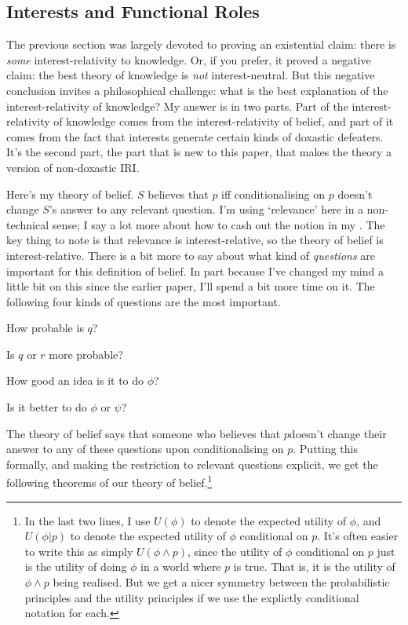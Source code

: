 \subsection{Interests and Functional Roles}
The previous section was largely devoted to proving an existential claim: there is \textit{some} interest-relativity to knowledge. Or, if you prefer, it proved a negative claim: the best theory of knowledge is \textit{not} interest-neutral. But this negative conclusion invites a philosophical challenge: what is the best explanation of the interest-relativity of knowledge? My answer is in two parts. Part of the interest-relativity of knowledge comes from the interest-relativity of belief, and part of it comes from the fact that interests generate certain kinds of doxastic defeaters. It's the second part, the part that is new to this paper, that makes the theory a version of non-doxastic IRI.

Here's my theory of belief. $S$ believes that $p$ iff conditionalising on $p$ doesn't change $S$'s answer to any relevant question. I'm using `relevance' here in a non-technical sense; I say a lot more about how to cash out the notion in my \citeyearpar{Weatherson2005-WEACWD}. The key thing to note is that relevance is interest-relative, so the theory of belief is interest-relative. There is a bit more to say about what kind of \textit{questions} are important for this definition of belief. In part because I've changed my mind a little bit on this since the earlier paper, I'll spend a bit more time on it. The following four kinds of questions are the most important.

\begin{itemize*}
\item How probable is $q$?
\item Is $q$ or $r$ more probable?
\item How good an idea is it to do $\phi$?
\item Is it better to do $\phi$ or $\psi$?
\end{itemize*}

\noindent The theory of belief says that someone who believes that $p$doesn't change their answer to any of these questions upon conditionalising on $p$. Putting this formally, and making the restriction to relevant questions explicit, we get the following theorems of our theory of belief.\footnote{In the last two lines, I use $U(\phi)$ to denote the expected utility of $\phi$, and $U(\phi | p)$ to denote the expected utility of $\phi$ conditional on $p$. It's often easier to write this as simply $U(\phi \wedge p)$, since the utility of $\phi$ conditional on $p$ just is the utility of doing $\phi$ in a world where $p$ is true. That is, it is the utility of $\phi \wedge p$ being realised. But we get a nicer symmetry between the probabilistic principles and the utility principles if we use the explictly conditional notation for each.}

